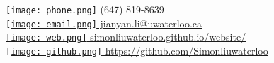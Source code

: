 \documentclass[margin,line]{resume}
\begin{document}
{
    \hfill \texttt{[image: phone.png]} (647) 819-8639 \vspace{0mm}\\\vspace{0mm}%
    \hfill \href{mailto:jianyan.li@uwaterloo.ca}{\texttt{[image: email.png]} jianyan.li@uwaterloo.ca}       \vspace{0mm}\\\vspace{0mm}%
    \hfill \href{https://simonliuwaterloo.github.io/website/}{\texttt{[image: web.png]} simonliuwaterloo.github.io/website/}           \vspace{0mm}\\\vspace{0mm}%
    \hfill \href{https://github.com/Simonliuwaterloo}{{\texttt{[image: github.png]} https://github.com/Simonliuwaterloo}} \vspace{0mm}\\\vspace{-9mm}%
}
\end{document}
